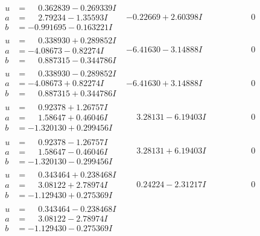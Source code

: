 \documentclass[1p]{elsarticle_modified}
\theoremstyle{definition}
\begin{document}
$$\begin{array}{c|c|c}
\begin{aligned}
u &= \phantom{-}0.362839 - 0.269339 I \\
a &= \phantom{-}2.79234 - 1.35593 I \\
b &= -0.991695 - 0.163221 I\end{aligned}
 & -0.22669 + 2.60398 I & \phantom{-0.000000 } 0 \\ \hline\begin{aligned}
u &= \phantom{-}0.338930 + 0.289852 I \\
a &= -4.08673 - 0.82274 I \\
b &= \phantom{-}0.887315 - 0.344786 I\end{aligned}
 & -6.41630 - 3.14888 I & \phantom{-0.000000 } 0 \\ \hline\begin{aligned}
u &= \phantom{-}0.338930 - 0.289852 I \\
a &= -4.08673 + 0.82274 I \\
b &= \phantom{-}0.887315 + 0.344786 I\end{aligned}
 & -6.41630 + 3.14888 I & \phantom{-0.000000 } 0 \\ \hline\begin{aligned}
u &= \phantom{-}0.92378 + 1.26757 I \\
a &= \phantom{-}1.58647 + 0.46046 I \\
b &= -1.320130 + 0.299456 I\end{aligned}
 & \phantom{-}3.28131 - 6.19403 I & \phantom{-0.000000 } 0 \\ \hline\begin{aligned}
u &= \phantom{-}0.92378 - 1.26757 I \\
a &= \phantom{-}1.58647 - 0.46046 I \\
b &= -1.320130 - 0.299456 I\end{aligned}
 & \phantom{-}3.28131 + 6.19403 I & \phantom{-0.000000 } 0 \\ \hline\begin{aligned}
u &= \phantom{-}0.343464 + 0.238468 I \\
a &= \phantom{-}3.08122 + 2.78974 I \\
b &= -1.129430 + 0.275369 I\end{aligned}
 & \phantom{-}0.24224 - 2.31217 I & \phantom{-0.000000 } 0 \\ \hline\begin{aligned}
u &= \phantom{-}0.343464 - 0.238468 I \\
a &= \phantom{-}3.08122 - 2.78974 I \\
b &= -1.129430 - 0.275369 I\end{aligned}

\end{array}$$
\end{document}
